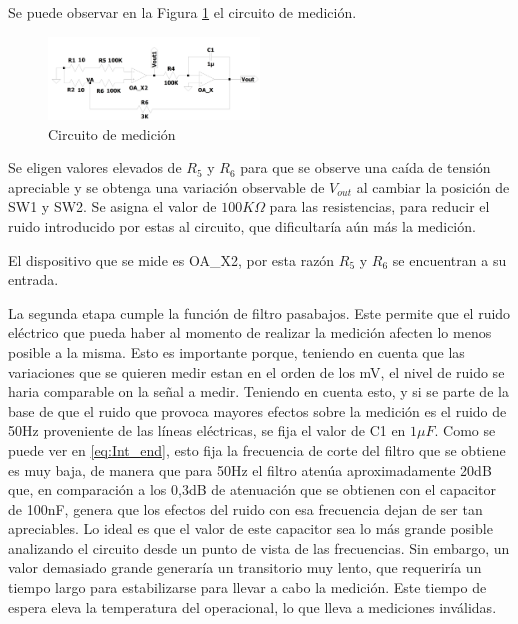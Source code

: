Se puede observar en la Figura \ref{fig:Circuito_completo} el circuito de medici\'on.

\begin{figure}[H]
   
    \centering
    \includegraphics[width=0.5\textwidth]{../EJ3/Recursos/Circuito_completo}
    \caption{Circuito de medici\'on}
    \label{fig:Circuito_completo}
\end{figure}

Se eligen valores elevados de $R_5$ y $R_6$ para que se observe una ca\'ida de tensi\'on apreciable y se obtenga una variaci\'on observable de $V_{out}$ al cambiar la posici\'on  de SW1 y SW2. Se asigna el valor de $100K\Omega $ para las resistencias, para reducir el ruido introducido por estas al circuito, que dificultar\'ia a\'un m\'as la medici\'on.

\noindent El dispositivo que se mide es OA\_X2, por esta raz\'on $R_5$ y $R_6$ se encuentran a su entrada. 

\noindent La segunda etapa cumple la funci\'on de filtro pasabajos. Este permite que el ruido el\'ectrico que pueda haber al momento de realizar la medici\'on afecten lo menos posible a la misma. Esto es importante porque, teniendo en cuenta que las variaciones que se quieren medir estan en el orden de los mV, el nivel de ruido se haria comparable on la se\~nal a medir.
Teniendo en cuenta esto, y si se parte de la base de que el ruido que provoca mayores efectos sobre la medici\'on es el ruido de 50Hz proveniente de las l\'ineas el\'ectricas, se fija el valor de C1 en $1 \mu F$. Como se puede ver en \ref{eq:Int_end}, esto fija la frecuencia de corte del filtro que se obtiene es muy baja, de manera que para 50Hz el filtro aten\'ua aproximadamente 20dB que, en comparaci\'on a los 0,3dB de atenuaci\'on que se obtienen con el capacitor de 100nF, genera que los efectos del ruido con esa frecuencia dejan de ser tan apreciables. Lo ideal es que el valor de este capacitor sea lo m\'as grande posible analizando el circuito desde un punto de vista de las frecuencias. Sin embargo, un valor demasiado grande generar\'ia un transitorio muy lento, que requerir\'ia un tiempo largo para estabilizarse para llevar a cabo la medici\'on. Este tiempo de espera eleva la temperatura del operacional, lo que lleva a mediciones inv\'alidas.
\newline

